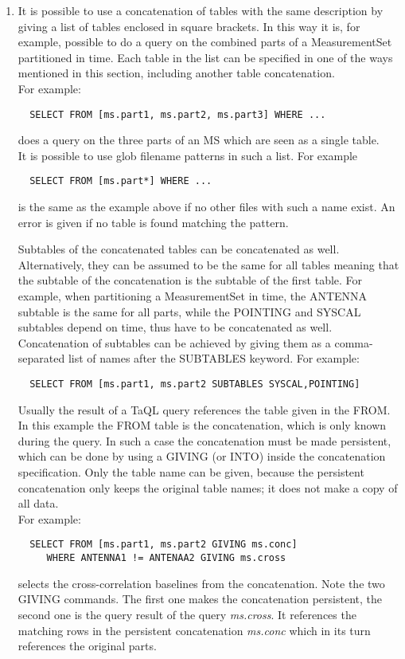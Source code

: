 \begin{enumerate}
\item
\label{TAQL:CONCTAB}
It is possible to use a concatenation of tables with the same
description by giving a list of tables enclosed in square brackets.
In this way it is, for example, possible to do a query on the combined
parts of a MeasurementSet partitioned in time.
Each table in the list can be specified in
one of the ways mentioned in this section, including another table
concatenation.
\\For example:
\begin{verbatim}
  SELECT FROM [ms.part1, ms.part2, ms.part3] WHERE ...
\end{verbatim}
does  a query on the three parts of an MS which are seen as a single
table.
\\It is possible to use glob filename patterns in such a list. For example
\begin{verbatim}
  SELECT FROM [ms.part*] WHERE ...
\end{verbatim}
is the same as the example above if no other files with such a name exist. An
error is given if no table is found matching the pattern.

Subtables of the concatenated tables can be concatenated as well.
Alternatively, they can be assumed to be the same for all tables meaning that the
subtable of the concatenation is the subtable of the first table.
For example, when partitioning a MeasurementSet in time, the ANTENNA
subtable is the same for all parts, while the POINTING and SYSCAL
subtables depend on time, thus have to be concatenated as well.
Concatenation of subtables can be achieved by giving them as a
comma-separated list of names after
the SUBTABLES keyword. For example: 
\begin{verbatim}
  SELECT FROM [ms.part1, ms.part2 SUBTABLES SYSCAL,POINTING]
\end{verbatim}

Usually the result of a TaQL query references the table given in the FROM.
In this example the FROM table is the concatenation, which is
only known during the query. In such a case the concatenation must be made
persistent, which can be done by using a GIVING (or INTO) inside the
concatenation specification. Only the table name can be given, because
the persistent concatenation only keeps the original table names; it
does not make a copy of all data.
\\For example:
\begin{verbatim}
  SELECT FROM [ms.part1, ms.part2 GIVING ms.conc]
     WHERE ANTENNA1 != ANTENAA2 GIVING ms.cross
\end{verbatim}
selects the cross-correlation baselines from the concatenation.
Note the two GIVING commands. The first one makes the concatenation
persistent, the second one is the query result of the query
{\em ms.cross}. It references the 
matching rows in the persistent concatenation {\em ms.conc} which in
its turn references the original parts.
\end{enumerate}

